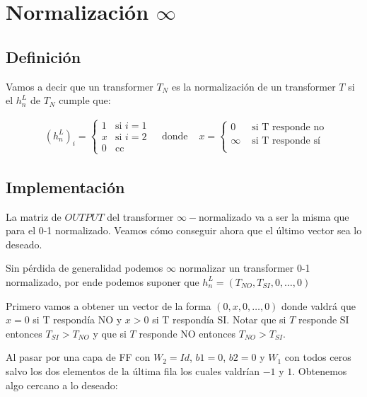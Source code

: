 \section*{Normalización $\infty$}

\subsection*{Definición}

Vamos a decir que un transformer $T_N$ es la normalización  de un transformer $T$ si el $h_n^L$ de $T_N$ cumple que:

\begin{align*}
    & (h_n^L)_i =
    \begin{cases}
    1 & \text{si } i = 1 \\
    x & \text{si } i = 2 \\
    0 & \text{cc }
    \end{cases} 
    & \text{ donde }
    & x = 
    \begin{cases}
    0 & \text{ si T responde no }  \\
    \infty & \text{ si T responde sí } \\
    \end{cases} 
\end{align*}


\subsection*{Implementación}

La matriz de $OUTPUT$ del transformer $\infty-$normalizado va a ser la misma que para el 0-1 normalizado. Veamos cómo conseguir ahora que el último vector sea lo deseado.

Sin pérdida de generalidad podemos $\infty$ normalizar un transformer 0-1 normalizado, por ende podemos suponer que $h_n^L = (T_{NO}, T_{SI}, 0, \dots, 0)$

Primero vamos a obtener un vector de la forma $(0,x,0,\dots,0)$ donde valdrá que $x = 0$ si T respondía NO y $x>0$ si T respondía SI.
Notar que si $T$ responde SI entonces $T_{SI} > T_{NO}$ y que si $T$ responde NO entonces $T_{NO} > T_{SI}$.


Al pasar por una capa de FF con $W_2 = Id$, $b1 = 0$, $b2 = 0$ y $W_1$ con todos ceros salvo los dos elementos de la última fila los cuales valdrían $-1$ y $1$. Obtenemos algo cercano a lo deseado:



